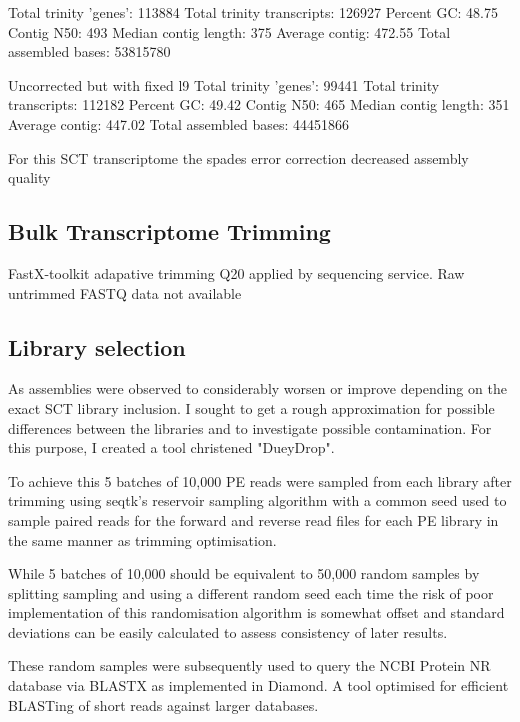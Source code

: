 Total trinity 'genes':  113884
Total trinity transcripts:      126927
Percent GC: 48.75
Contig N50: 493
Median contig length: 375
Average contig: 472.55
Total assembled bases: 53815780




Uncorrected but with fixed l9 
Total trinity 'genes':  99441
Total trinity transcripts:      112182
Percent GC: 49.42
Contig N50: 465
Median contig length: 351
Average contig: 447.02
Total assembled bases: 44451866

For this SCT transcriptome the spades error correction decreased assembly quality



\subsection{Bulk Transcriptome Trimming}

FastX-toolkit adapative trimming Q20 applied by sequencing service.
Raw untrimmed FASTQ data not available



\subsection{Library selection}
As assemblies were observed to considerably worsen or improve depending on the exact 
SCT library inclusion.  I sought to get a rough approximation for possible differences between
the libraries and to investigate possible contamination.  For this purpose, I created a tool
christened "DueyDrop".

To achieve this 5 batches of 10,000 PE reads were sampled from each library after trimming %
using seqtk's \citep{SeqtkGitHub} reservoir sampling algorithm with a common seed used to sample paired
reads for the forward and reverse read files for each PE library in the same manner as trimming optimisation.

While 5 batches of 10,000 should be equivalent to 50,000 random samples by splitting sampling and using
a different random seed each time the risk of poor implementation of this randomisation algorithm is 
somewhat offset and standard deviations can be easily calculated to assess consistency of later results.

These random samples were subsequently used to query the NCBI Protein NR database via BLASTX as implemented
in Diamond.  A tool optimised for efficient BLASTing of short reads against larger databases.

